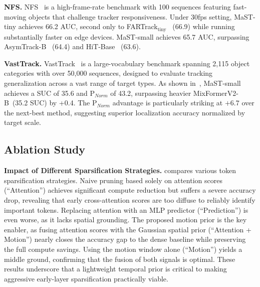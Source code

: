 \textbf{NFS.} NFS~\cite{nfs} is a high-frame-rate benchmark with 100 sequences featuring fast-moving objects that challenge tracker responsiveness.  Under 30fps setting, MaST-tiny achieves 66.2 AUC, second only to FARTrack$_\text{tiny}$~\cite{wang2026fartrack} (66.9) while running substantially faster on edge devices. MaST-small achieves 65.7 AUC, surpassing AsymTrack-B~\cite{zhu2025asymtrack} (64.4) and HiT-Base~\cite{HiT} (63.6).

\textbf{VastTrack.} VastTrack~\cite{peng2024vasttrack} is a large-vocabulary benchmark spanning 2,115 object categories with over 50,000 sequences, designed to evaluate tracking generalization across a vast range of target types. As shown in~, MaST-small achieves a SUC of 35.6 and P$_{Norm}$ of 43.2, surpassing heavier MixFormerV2-B~\cite{mixformerv2}(35.2 SUC) by +0.4. The P$_{Norm}$ advantage is particularly striking at $+6.7$ over the next-best method, suggesting superior localization accuracy normalized by target scale. 


\subsection{Ablation Study}

\begin{table}[t]
  
\end{table}
\begin{table}[t]
  
\end{table}

%     
   
%     

\textbf{Impact of Different Sparsification Strategies.}
 compares various token sparsification strategies. Naive pruning based solely on attention scores (``Attention'') achieves significant compute reduction but suffers a severe accuracy drop, revealing that early cross-attention scores are too diffuse to reliably identify important tokens. Replacing attention with an MLP predictor (``Prediction'') is even worse, as it lacks spatial grounding. The proposed motion prior is the key enabler, as fusing attention scores with the Gaussian spatial prior (``Attention + Motion'') nearly closes the accuracy gap to the dense baseline while preserving the full compute savings. Using the motion window alone (``Motion'') yields a middle ground, confirming that the fusion of both signals is optimal. These results underscore that a lightweight temporal prior is critical to making aggressive early-layer sparsification practically viable.



